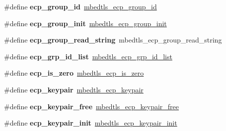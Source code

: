 \begin{DoxyCompactItemize}
\item 
\mbox{\label{compat-1_83_8h_a2edc38cec015e67dd46fe8414101cea7}} 
\#define {\bfseries ecp\+\_\+group\+\_\+id}~\mbox{\hyperlink{ecp_8h_af79e530ea8f8416480f805baa20b1a2d}{mbedtls\+\_\+ecp\+\_\+group\+\_\+id}}
\item 
\mbox{\label{compat-1_83_8h_ae7d84e9bd6aa5e5e07da9f699b6b963d}} 
\#define {\bfseries ecp\+\_\+group\+\_\+init}~\mbox{\hyperlink{ecp_8h_a5102f6d44d9f16aece7b2e685c31e5da}{mbedtls\+\_\+ecp\+\_\+group\+\_\+init}}
\item 
\mbox{\label{compat-1_83_8h_a96f0cdec73fe28076bc0e1460b53de33}} 
\#define {\bfseries ecp\+\_\+group\+\_\+read\+\_\+string}~mbedtls\+\_\+ecp\+\_\+group\+\_\+read\+\_\+string
\item 
\mbox{\label{compat-1_83_8h_aea8abce2a8e2035ff67663be72f0be4c}} 
\#define {\bfseries ecp\+\_\+grp\+\_\+id\+\_\+list}~\mbox{\hyperlink{ecp_8h_a84d2fed0c0cdde5201451bb5461aa275}{mbedtls\+\_\+ecp\+\_\+grp\+\_\+id\+\_\+list}}
\item 
\mbox{\label{compat-1_83_8h_adab7d6d13495d5c8589b75ba97aabb7d}} 
\#define {\bfseries ecp\+\_\+is\+\_\+zero}~\mbox{\hyperlink{ecp_8h_a17c7d8f0ee985c2ea5713659eccfd955}{mbedtls\+\_\+ecp\+\_\+is\+\_\+zero}}
\item 
\mbox{\label{compat-1_83_8h_a7591d6eee6173ca27e2df41c656ac6a1}} 
\#define {\bfseries ecp\+\_\+keypair}~\mbox{\hyperlink{structmbedtls__ecp__keypair}{mbedtls\+\_\+ecp\+\_\+keypair}}
\item 
\mbox{\label{compat-1_83_8h_a5c3a58b7b743b9a7ee890deac36b6a4f}} 
\#define {\bfseries ecp\+\_\+keypair\+\_\+free}~\mbox{\hyperlink{ecp_8h_a04ea689d8d97b423a5d646cd9c53f400}{mbedtls\+\_\+ecp\+\_\+keypair\+\_\+free}}
\item 
\mbox{\label{compat-1_83_8h_a6a1129c5c001ab0b44339e76dba625a4}} 
\#define {\bfseries ecp\+\_\+keypair\+\_\+init}~\mbox{\hyperlink{ecp_8h_a770d9e33e938f2033fd3f77e6fa2a697}{mbedtls\+\_\+ecp\+\_\+keypair\+\_\+init}}
\item 
\mbox{\label{compat-1_83_8h_adb63bd2a6de68b8e65599318f6f9756a}} 

\end{DoxyCompactItemize}

